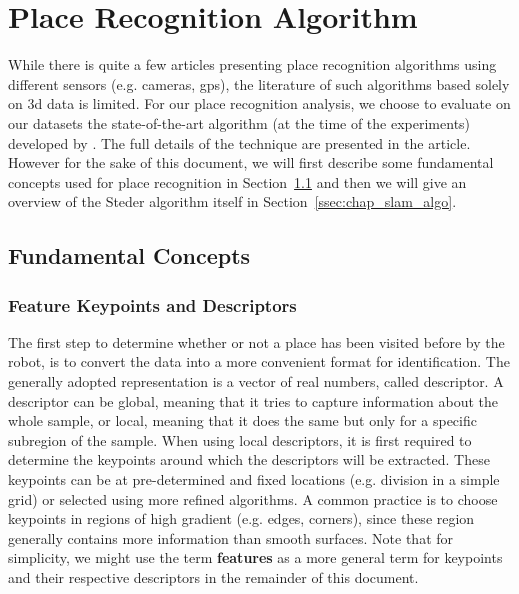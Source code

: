 \section{Place Recognition Algorithm}
\label{sec:chap_slam_algo}

While there is quite a few articles presenting place recognition algorithms using different sensors (e.g. cameras, \gls*{gps}), the literature of such algorithms based solely on \gls*{3d} data is limited. For our place recognition analysis, we choose to evaluate on our datasets the state-of-the-art algorithm (at the time of the experiments) developed by \citet{Steder2011b}. The full details of the technique are presented in the article. However for the sake of this document, we will first describe some fundamental concepts used for place recognition in Section~\ref{ssec:chap_slam_basics} and then we will give an overview of the Steder algorithm itself in Section~\ref{ssec:chap_slam_algo}.


\subsection{Fundamental Concepts}
\label{ssec:chap_slam_basics}

\subsubsection{Feature Keypoints and Descriptors}
\label{ssub:feature_keypoints_and_descriptors}

The first step to determine whether or not a place has been visited before by the robot, is to convert the data into a more convenient format for identification. The generally adopted representation is a vector of real numbers, called descriptor. A descriptor can be global, meaning that it tries to capture information about the whole sample, or local, meaning that it does the same but only for a specific subregion of the sample. When using local descriptors, it is first required to determine the keypoints around which the descriptors will be extracted. These keypoints can be at pre-determined and fixed locations (e.g. division in a simple grid) or selected using more refined algorithms. A common practice is to choose keypoints in regions of high gradient (e.g. edges, corners), since these region generally contains more information than smooth surfaces. Note that for simplicity, we might use the term \textbf{features} as a more general term for keypoints and their respective descriptors in the remainder of this document.

